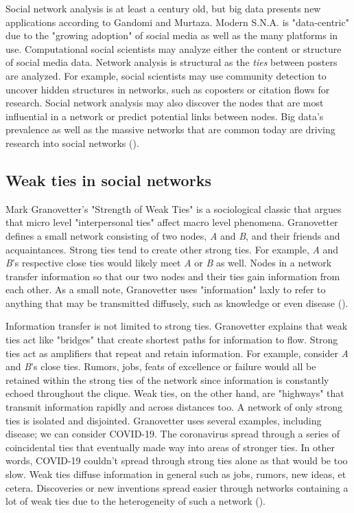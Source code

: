 \documentclass[12pt, a4paper]{article}
\begin{document}
Social network analysis is at least a century old, but big data presents new applications according to Gandomi and Murtaza. Modern S.N.A. is "data-centric" due to the "growing adoption" of social media as well as the many platforms in use. Computational social scientists may analyze either the content or structure of social media data. Network analysis is structural as the \textit{ties} between posters are analyzed. For example, social scientists may use community detection to uncover hidden structures in networks, such as coposters or citation flows for research. Social network analysis may also discover the nodes that are most influential in a network or predict potential links between nodes. Big data's prevalence as well as the massive networks that are common today are driving research into social networks (\cite{gandomiamir2015}).

\subsection{Weak ties in social networks}
Mark Granovetter's "Strength of Weak Ties" is a sociological classic that argues that micro level "interpersonal ties" affect macro level phenomena. Granovetter defines a small network consisting of two nodes, \textit{A} and \textit{B}, and their friends and acquaintances. Strong ties tend to create other strong ties. For example, \textit{A} and \textit{B}'s respective close ties would likely meet \textit{A} or \textit{B} as well. Nodes in a network transfer information so that our two nodes and their ties gain information from each other. As a small note, Granovetter uses "information" laxly to refer to anything that may be transmitted diffusely, such as knowledge or even disease (\cite{granovetter1973}).

Information transfer is not limited to strong ties. Granovetter explains that weak ties act like "bridges" that create shortest paths for information to flow. Strong ties act as amplifiers that repeat and retain information. For example, consider \textit{A} and \textit{B}'s close ties. Rumors, jobs, feats of excellence or failure would all be retained within the strong ties of the network since information is constantly echoed throughout the clique. Weak ties, on the other hand, are "highways" that transmit information rapidly and across distances too. A network of only strong ties is isolated and disjointed. Granovetter uses several examples, including disease; we can consider COVID-19. The coronavirus spread through a series of coincidental ties that eventually made way into areas of stronger ties. In other words, COVID-19 couldn't spread through strong ties alone as that would be too slow. Weak ties diffuse information in general such as jobs, rumors, new ideas, et cetera. Discoveries or new inventions spread easier through networks containing a lot of weak ties due to the heterogeneity of such a network (\cite{granovetter1973}).
\end{document}
